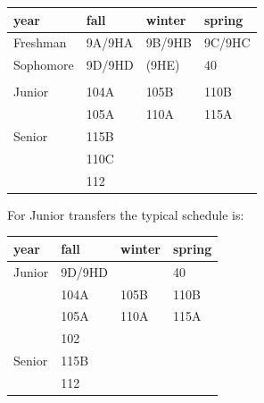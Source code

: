 \documentclass[12pt]{article}
\begin{document}
\begin{table}
\begin{center}
\begin{tabular}{|l|l|l|l|}
\hline
year      & fall    & winter & spring  \\
\hline
Freshman  & 9A/9HA  & 9B/9HB  & 9C/9HC \\
\hline
Sophomore & 9D/9HD  & (9HE)   & 40     \\
          &         &         &        \\
\hline
Junior    & 104A & 105B & 110B\\
          & 105A & 110A & 115A\\
\hline
Senior    & 115B &        & \\
          & 110C &        & \\
          & 112  &        & \\

\hline 
\end{tabular}
\end{center}
\end{table}
For Junior transfers the typical schedule is:
\begin{table}
\begin{center}
\begin{tabular}{|l|l|l|l|}
\hline
year      & fall    & winter & spring  \\
\hline
Junior    & 9D/9HD  &    & 40     \\
          & 104A & 105B & 110B\\
          & 105A & 110A & 115A\\
          & 102 &       & \\

\hline
Senior    & 115B &        & \\
          & 112  &        & \\

\hline 
\end{tabular}
\end{center}
\end{table}
 
\end{document}
